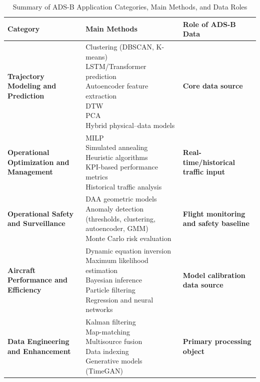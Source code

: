 \begin{table}[h]
	\centering
	\caption{Summary of ADS-B Application Categories, Main Methods, and Data Roles}
	\label{tb: 8categories}
	\begin{tabular}{p{3cm} p{6cm} p{3cm}}
		\hline
		\textbf{Category} & \textbf{Main Methods} & \textbf{Role of ADS-B Data} \\
		\hline
		\textbf{Trajectory Modeling and Prediction} &
		\makecell[l]{Clustering (DBSCAN, K-means)\\
			LSTM/Transformer prediction\\
			Autoencoder feature extraction\\
			DTW\\
			PCA\\
			Hybrid physical–data models} &
		\textbf{Core data source} \\
		\hline
		
		\textbf{Operational Optimization and Management} &
		\makecell[l]{
			MILP\\
			Simulated annealing\\
			Heuristic algorithms\\
			KPI-based performance metrics\\
			Historical traffic analysis
		} &
		\textbf{Real-time/historical traffic input} \\
		\hline
		
		\textbf{Operational Safety and Surveillance} &
		\makecell[l]{
			DAA geometric models\\
			Anomaly detection (thresholds, clustering, autoencoder, GMM)\\
			Monte Carlo risk evaluation
		} &
		\textbf{Flight monitoring and safety baseline} \\
		\hline
		
		\textbf{Aircraft Performance and Efficiency} &
		\makecell[l]{
			Dynamic equation inversion\\
			Maximum likelihood estimation\\
			Bayesian inference\\
			Particle filtering\\
			Regression and neural networks
		} &
		\textbf{Model calibration data source} \\
		\hline
		
		\textbf{Data Engineering and Enhancement} &
		\makecell[l]{
			Kalman filtering\\
			Map-matching\\
			Multisource fusion\\
			Data indexing\\
			Generative models (TimeGAN)
		} &
		\textbf{Primary processing object} \\
		\hline
		

\end{tabular}
\end{table}
